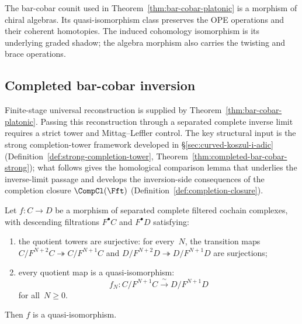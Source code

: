 \begin{remark}
\label{rem:qi-vs-homology-iso-counit}%
The bar-cobar counit used in
Theorem~\ref{thm:bar-cobar-platonic} is a morphism of chiral
algebras. Its quasi-isomorphism class preserves the OPE operations and
their coherent homotopies.  The induced cohomology isomorphism is its
underlying graded shadow; the algebra morphism also carries the
twisting and brace operations.
\end{remark}


\subsection{Completed bar-cobar inversion}
\label{subsec:completed-bar-cobar-inversion}

Finite-stage universal reconstruction is supplied by
Theorem~\ref{thm:bar-cobar-platonic}.  Passing this reconstruction
through a separated complete inverse limit requires a strict tower and
Mittag--Leffler control.  The key structural input is the strong
completion-tower framework developed in
\S\ref{sec:curved-koszul-i-adic}
(Definition~\ref{def:strong-completion-tower},
Theorem~\ref{thm:completed-bar-cobar-strong}); what follows gives the
homological comparison lemma that underlies the inverse-limit passage
and develops the inversion-side consequences of the completion closure
$\CompCl(\Fft)$ (Definition~\ref{def:completion-closure}).

\begin{lemma}
\label{lem:complete-filtered-comparison}
Let $f\colon C \to D$ be a morphism of separated complete filtered
cochain complexes, with descending filtrations
$F^\bullet C$ and $F^\bullet D$ satisfying:
\begin{enumerate}[label=\textup{(\roman*)}]
\item the quotient towers are surjective: for every~$N$, the
 transition maps $C/F^{N+2}C \twoheadrightarrow C/F^{N+1}C$ and
 $D/F^{N+2}D \twoheadrightarrow D/F^{N+1}D$ are surjections;
\item every quotient map is a quasi-isomorphism:
 \[
 f_N \colon C/F^{N+1}C \xrightarrow{\;\sim\;} D/F^{N+1}D
 \]
 for all~$N \ge 0$.
\end{enumerate}
Then $f$ is a quasi-isomorphism.
\end{lemma}

